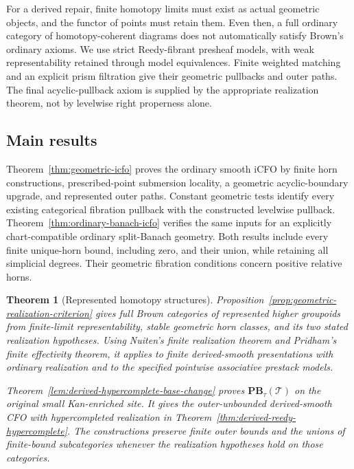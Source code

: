 \documentclass[12pt]{amsart}
\newtheorem{maintheorem}{Theorem}
\theoremstyle{definition}
\theoremstyle{remark}
\numberwithin{equation}{section}
\begin{document}
For a derived repair, finite homotopy limits must
exist as actual geometric objects, and the functor
of points must retain them. Even then, a full
ordinary category of homotopy-coherent diagrams
does not automatically satisfy Brown's ordinary
axioms. We use strict Reedy-fibrant presheaf models,
with weak representability retained through
model equivalences. Finite weighted matching
and an explicit prism filtration give their
geometric pullbacks and outer paths.
The final acyclic-pullback axiom is supplied by
the appropriate realization theorem, not by
levelwise right properness alone.

\subsection{Main results}

Theorem~\ref{thm:geometric-icfo} proves the ordinary smooth
iCFO by finite horn constructions, prescribed-point
submersion locality, a geometric acyclic-boundary upgrade,
and represented outer paths. Constant geometric tests
identify every existing categorical fibration pullback
with the constructed levelwise pullback.
Theorem~\ref{thm:ordinary-banach-icfo} verifies the same
inputs for an explicitly chart-compatible ordinary
split-Banach geometry. Both results include every finite
unique-horn bound, including zero, and their union, while
retaining all simplicial degrees. Their geometric fibration
conditions concern positive relative horns.

\begin{maintheorem}[Represented homotopy structures]
\label{main:represented}
Proposition~\ref{prop:geometric-realization-criterion}
gives full Brown categories of represented higher groupoids
from finite-limit representability, stable geometric horn
classes, and its two stated realization hypotheses.
Using Nuiten's finite realization theorem and Pridham's
finite effectivity theorem, it applies to finite
derived-smooth presentations with ordinary realization
and to the specified pointwise associative prestack models.

Theorem~\ref{lem:derived-hypercomplete-base-change}
proves $\mathbf{PB}_\tau(\mathcal T)$ on the original
small Kan-enriched site. It gives the outer-unbounded
derived-smooth CFO with hypercompleted realization
in Theorem~\ref{thm:derived-reedy-hypercomplete}.
The constructions preserve finite outer bounds and the
unions of finite-bound subcategories whenever the
realization hypotheses hold on those categories.
\end{maintheorem}
\end{document}

